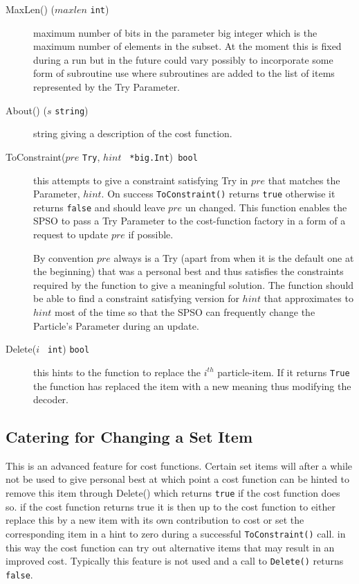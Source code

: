 \documentclass[a4paper,oneside,english]{book}
\numberwithin{equation}{section}
\numberwithin{figure}{section}
\begin{document}
\begin{description}
	\item[MaxLen() ($maxlen$ \texttt{int})]
	maximum number of bits in the parameter big integer which is the
	maximum number of elements in the subset.
	At the moment this is fixed during a run but in the future could vary possibly to incorporate some form of subroutine use where subroutines are added to the list of items represented by the Try Parameter.
	
	\item[About() ($s$ \texttt{string})]
	string giving a description of the cost function.
	
	\item[ToConstraint($pre$ \texttt{Try}, $hint$ \texttt{ *big.Int})\texttt{ bool}]
	this attempts to  give a constraint satisfying Try  in  $pre$ that matches the  Parameter, $hint$. 
    On success \texttt{ToConstraint()} returns \texttt{true} otherwise it returns \texttt{false} and should leave $pre$ un changed. This function enables the SPSO to pass a Try Parameter to the cost-function factory in a form of a request to update $pre$ if possible. 
    
    By convention $pre$ always is a Try (apart from when it is the default one  at the
	beginning) that was a personal best and thus satisfies the constraints required
	by the function to give a meaningful solution. The function should be able to
	find a constraint satisfying version for  $hint$ that approximates to $hint$  most
	of the time so that the SPSO can frequently change the Particle's Parameter
	during an update.
	
	\item[Delete($i$ \texttt{ int}) \texttt{bool}]
	this hints to the function to replace the $i^{th}$ particle-item.
	If it returns \texttt{True} the function has replaced the item with a new meaning
	thus modifying the decoder. 
	
\end{description}

\subsection{Catering for Changing a  Set Item}

This is an advanced feature for cost functions. Certain set items will after a
while not be used to give personal best at which point a cost function can be
hinted to remove this item through Delete() which returns \texttt{true} if the cost
function does so. if the cost function  returns true it is then up to the cost
function to either replace this by a new item with its own contribution to cost
or set the  corresponding item in a hint to zero during a successful
\texttt{ToConstraint()} call. in this way the cost function  can  try  out alternative
items that may result in an improved cost. Typically this feature is not used
and a call to  \texttt{Delete()} returns\texttt{ false}.
\end{document}
